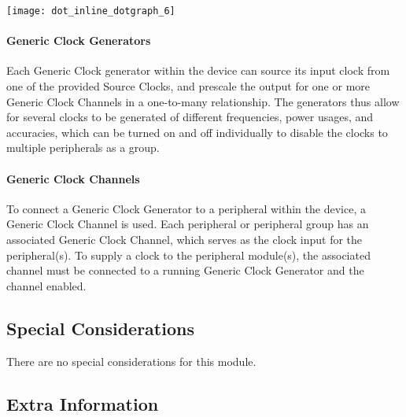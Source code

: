 \begin{DoxyImageNoCaption}
  \mbox{\texttt{[image: dot\_inline\_dotgraph\_6]}}
\end{DoxyImageNoCaption}
\hypertarget{group__asfdoc__sam0__system__clock__group_asfdoc_sam0_system_clock_module_overview_gclk_generators}{}\paragraph{Generic Clock Generators}\label{group__asfdoc__sam0__system__clock__group_asfdoc_sam0_system_clock_module_overview_gclk_generators}
Each Generic Clock generator within the device can source its input clock from one of the provided Source Clocks, and prescale the output for one or more Generic Clock Channels in a one-\/to-\/many relationship. The generators thus allow for several clocks to be generated of different frequencies, power usages, and accuracies, which can be turned on and off individually to disable the clocks to multiple peripherals as a group.\hypertarget{group__asfdoc__sam0__system__clock__group_asfdoc_sam0_system_clock_module_overview_gclk_channels}{}\paragraph{Generic Clock Channels}\label{group__asfdoc__sam0__system__clock__group_asfdoc_sam0_system_clock_module_overview_gclk_channels}
To connect a Generic Clock Generator to a peripheral within the device, a Generic Clock Channel is used. Each peripheral or peripheral group has an associated Generic Clock Channel, which serves as the clock input for the peripheral(s). To supply a clock to the peripheral module(s), the associated channel must be connected to a running Generic Clock Generator and the channel enabled.\hypertarget{group__asfdoc__sam0__system__clock__group_asfdoc_sam0_system_clock_special_considerations}{}\subsection{Special Considerations}\label{group__asfdoc__sam0__system__clock__group_asfdoc_sam0_system_clock_special_considerations}
There are no special considerations for this module.\hypertarget{group__asfdoc__sam0__system__clock__group_asfdoc_sam0_system_clock_extra_info}{}\subsection{Extra Information}\label{group__asfdoc__sam0__system__clock__group_asfdoc_sam0_system_clock_extra_info}
